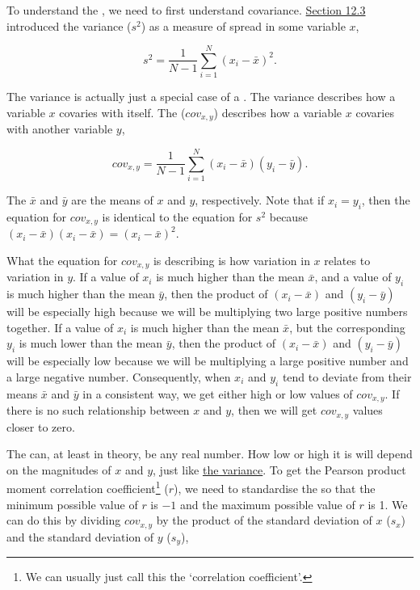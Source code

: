 \documentclass[
  openany]{krantz}
\begin{document}
To understand the , we need to first understand covariance.
\protect\hyperlink{the-variance}{Section 12.3} introduced the variance (\(s^{2}\)) as a measure of spread in some variable \(x\),

\[s^{2} = \frac{1}{N - 1}\sum_{i = 1}^{N}\left(x_{i} - \bar{x} \right)^{2}.\]

The variance is actually just a special case of a .
The variance describes how a variable \(x\) covaries with itself.
The  (\(cov_{x,y}\)) describes how a variable \(x\) covaries with another variable \(y\),

\[cov_{x, y} = \frac{1}{N - 1} \sum_{i = 1}^{N}\left(x_{i} - \bar{x} \right) \left(y_{i} - \bar{y} \right).\]

The \(\bar{x}\) and \(\bar{y}\) are the means of \(x\) and \(y\), respectively.
Note that if \(x_{i} = y_{i}\), then the equation for \(cov_{x,y}\) is identical to the equation for \(s^{2}\) because \(\left(x_{i} - \bar{x} \right) \left(x_{i} - \bar{x} \right) = \left(x_{i} - \bar{x} \right)^{2}\).

What the equation for \(cov_{x,y}\) is describing is how variation in \(x\) relates to variation in \(y\).
If a value of \(x_{i}\) is much higher than the mean \(\bar{x}\), and a value of \(y_{i}\) is much higher than the mean \(\bar{y}\), then the product of \(\left(x_{i} - \bar{x} \right)\) and \(\left(y_{i} - \bar{y} \right)\) will be especially high because we will be multiplying two large positive numbers together.
If a value of \(x_{i}\) is much higher than the mean \(\bar{x}\), but the corresponding \(y_{i}\) is much lower than the mean \(\bar{y}\), then the product of \(\left(x_{i} - \bar{x} \right)\) and \(\left(y_{i} - \bar{y} \right)\) will be especially low because we will be multiplying a large positive number and a large negative number.
Consequently, when \(x_{i}\) and \(y_{i}\) tend to deviate from their means \(\bar{x}\) and \(\bar{y}\) in a consistent way, we get either high or low values of \(cov_{x,y}\).
If there is no such relationship between \(x\) and \(y\), then we will get \(cov_{x,y}\) values closer to zero.

The  can, at least in theory, be any real number.
How low or high it is will depend on the magnitudes of \(x\) and \(y\), just like \protect\hyperlink{the-variance}{the variance}.
To get the Pearson product moment correlation coefficient\footnote{We can usually just call this the `correlation coefficient'.} (\(r\)), we need to standardise the  so that the minimum possible value of \(r\) is \(-1\) and the maximum possible value of \(r\) is 1.
We can do this by dividing \(cov_{x,y}\) by the product of the standard deviation of \(x\) (\(s_{x}\)) and the standard deviation of \(y\) (\(s_{y}\)),
\end{document}
